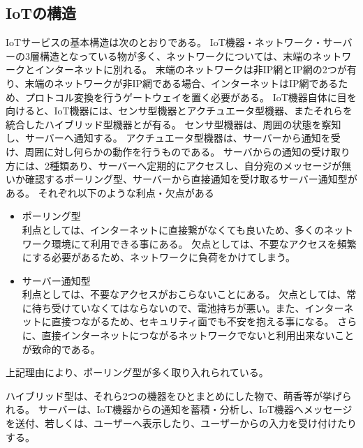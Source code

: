\subsection{IoTの構造}
IoTサービスの基本構造は次のとおりである。
IoT機器・ネットワーク・サーバーの3層構造となっている物が多く、ネットワークについては、末端のネットワークとインターネットに別れる。
末端のネットワークは非IP網とIP網の2つが有り、末端のネットワークが非IP網である場合、インターネットはIP網であるため、プロトコル変換を行うゲートウェイを置く必要がある。
IoT機器自体に目を向けると、IoT機器には、センサ型機器とアクチュエータ型機器、またそれらを統合したハイブリッド型機器とが有る。
センサ型機器は、周囲の状態を察知し、サーバーへ通知する。
アクチュエータ型機器は、サーバーから通知を受け、周囲に対し何らかの動作を行うものである。
サーバからの通知の受け取り方には、2種類あり、サーバーへ定期的にアクセスし、自分宛のメッセージが無いか確認するポーリング型、サーバーから直接通知を受け取るサーバー通知型がある。
それぞれ以下のような利点・欠点がある
\begin{itemize}
	\item ポーリング型\\
		利点としては、インターネットに直接繋がなくても良いため、多くのネットワーク環境にて利用できる事にある。
		欠点としては、不要なアクセスを頻繁にする必要があるため、ネットワークに負荷をかけてしまう。
	\item サーバー通知型\\
		利点としては、不要なアクセスがおこらないことにある。
		欠点としては、常に待ち受けていなくてはならないので、電池持ちが悪い。また、インターネットに直接つながるため、セキュリティ面でも不安を抱える事になる。
		さらに、直接インターネットにつながるネットワークでないと利用出来ないことが致命的である。
\end{itemize}
上記理由により、ポーリング型が多く取り入れられている。

ハイブリッド型は、それら2つの機器をひとまとめにした物で、萌香等が挙げられる。
サーバーは、IoT機器からの通知を蓄積・分析し、IoT機器へメッセージを送付、若しくは、ユーザーへ表示したり、ユーザーからの入力を受け付けたりする。



